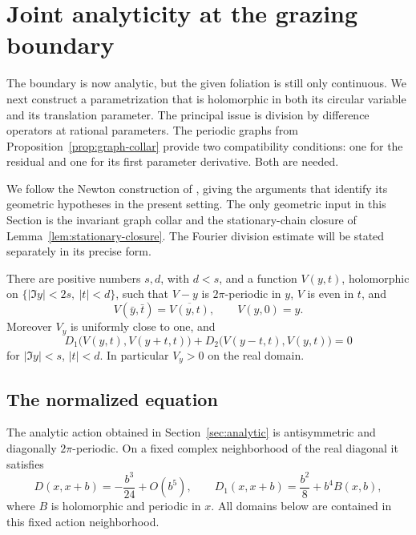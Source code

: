 \section{Joint analyticity at the grazing boundary}
\label{sec:joint}

The boundary is now analytic, but the given foliation is still only
continuous.  We next construct a parametrization that is holomorphic in
both its circular variable and its translation parameter.  The principal
issue is division by difference operators at rational parameters.  The
periodic graphs from Proposition~\ref{prop:graph-collar} provide two
compatibility conditions: one for the residual and one for its first
parameter derivative.  Both are needed.

We follow the Newton construction of \cite[Section~3]{NB}, giving the
arguments that identify its geometric hypotheses in the present setting.
The only geometric input in this Section is the invariant graph collar
and the stationary-chain closure of Lemma~\ref{lem:stationary-closure}.
The Fourier division estimate will be stated separately in its precise
form.

\begin{theorem}
\label{thm:joint}
There are positive numbers \(s,d\), with \(d<s\), and a function
\(V(y,t)\), holomorphic on \(\{|\Im y|<2s,\ |t|<d\}\), such that
\(V-y\) is \(2\pi\)-periodic in \(y\), \(V\) is even in \(t\), and
\[
 V(\bar y,\bar t)=\overline{V(y,t)},\qquad V(y,0)=y.
\]
Moreover \(V_y\) is uniformly close to one, and
\begin{equation}
 D_1\bigl(V(y,t),V(y+t,t)\bigr)
 +D_2\bigl(V(y-t,t),V(y,t)\bigr)=0
 \label{joint:stationary}
\end{equation}
for \(|\Im y|<s\), \(|t|<d\).  In particular \(V_y>0\) on the
real domain.
\end{theorem}

\subsection{The normalized equation}

The analytic action obtained in Section~\ref{sec:analytic} is
antisymmetric and diagonally \(2\pi\)-periodic.  On a fixed complex
neighborhood of the real diagonal it satisfies
\begin{equation}
 D(x,x+b)=-\frac{b^3}{24}+O(b^5),\qquad
 D_1(x,x+b)=\frac{b^2}{8}+b^4B(x,b),
 \label{joint:action}
\end{equation}
where \(B\) is holomorphic and periodic in \(x\).  All domains below
are contained in this fixed action neighborhood.

